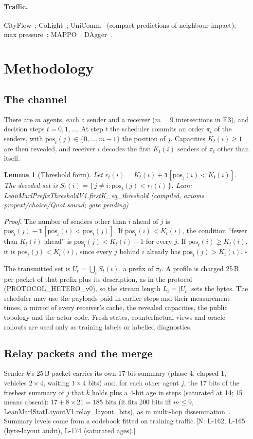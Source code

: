 \documentclass[11pt]{article}
\newtheorem{lemma}[claim]{Lemma}
\theoremstyle{definition}
\newcommand{\lean}[1]{\textsf{\footnotesize #1}}
\newif\ifshownotes\shownotestrue
\newcommand{\NOTE}[1]{\ifshownotes{\color{notecol}\,\textsf{\footnotesize[N: #1]}}\fi}
\newcommand{\LEANC}[1]{\textsf{\footnotesize Lean: #1 (compiled, axioms propext/choice/Quot.sound; gate pending)}}
\begin{document}
\paragraph{Traffic.} CityFlow~\cite{cityflow}; CoLight~\cite{colight}; UniComm~\cite{unicomm} (compact predictions of
neighbour impact); max pressure~\cite{varaiya2013}; MAPPO~\cite{mappo}; DAgger~\cite{dagger}.

\section{Methodology}\label{sec:method}
\subsection{The channel}\label{sec:model}
There are $m$ agents, each a sender and a receiver ($m=9$ intersections in E3), and decision steps $t=0,1,\dots$. At step
$t$ the scheduler commits an order $\pi_t$ of the senders, with $\mathrm{pos}_t(j)\in\{0,\dots,m-1\}$ the position of $j$.
Capacities $K_t(i)\ge1$ are then revealed, and receiver $i$ decodes the first $K_t(i)$ senders of $\pi_t$ other than itself.
\begin{lemma}[Threshold form]\label{lem:thr}
Let $r_t(i)=K_t(i)+\mathbf 1[\mathrm{pos}_t(i)<K_t(i)]$. The decoded set is
$S_t(i)=\{\,j\ne i:\mathrm{pos}_t(j)<r_t(i)\,\}$. \LEANC{LeanMarlPrefixThresholdV1.firstK\_eq\_threshold}
\end{lemma}
\emph{Proof.} The number of senders other than $i$ ahead of $j$ is $\mathrm{pos}_t(j)-\mathbf 1[\mathrm{pos}_t(i)<\mathrm{pos}_t(j)]$.
If $\mathrm{pos}_t(i)<K_t(i)$, the condition ``fewer than $K_t(i)$ ahead'' is $\mathrm{pos}_t(j)<K_t(i)+1$ for every $j$. If
$\mathrm{pos}_t(i)\ge K_t(i)$, it is $\mathrm{pos}_t(j)<K_t(i)$, since every $j$ behind $i$ already has $\mathrm{pos}_t(j)>K_t(i)$. $\square$

The transmitted set is $U_t=\bigcup_iS_t(i)$, a prefix of $\pi_t$. A profile is charged 25\,B per packet of that prefix
plus its description, as in the protocol (PROTOCOL\_HETERO\_v0), so the stream length $L_t=|U_t|$ sets the bytes. The
scheduler may use the payloads paid in earlier steps and their measurement times, a mirror of every receiver's cache, the
revealed capacities, the public topology and the actor code. Fresh states, counterfactual views and oracle rollouts are
used only as training labels or labelled diagnostics.

\subsection{Relay packets and the merge}\label{sec:relay}
Sender $k$'s 25\,B packet carries its own 17-bit summary (phase 4, elapsed 1, vehicles $2\times4$, waiting $1\times4$ bits)
and, for each other agent $j$, the 17 bits of the freshest summary of $j$ that $k$ holds plus a 4-bit age in steps
(saturated at 14; 15 means absent): $17+8\times21=185$ bits (it fits 200 bits iff $m\le9$,
\lean{LeanMarlStatLayoutV1.relay\_layout\_bits}), as in multi-hop
dissemination~\cite{tem,ac2c,fcmnet,expocomm}. Summary levels come from a codebook fitted on training
traffic.\NOTE{L-162, L-165 (byte-layout audit), L-174 (saturated ages).}
\end{document}

